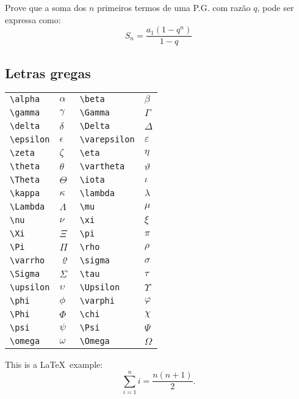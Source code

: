 \documentclass{gjvnq-livreto}
\begin{document}
\begin{latexExample}
Prove que a soma dos $n$ primeiros termos de uma P.G. com razão $q$, pode ser expressa como:
\begin{equation}
S_n = \frac{a_1(1-q^n)}{1-q}
\end{equation}
\end{latexExample}

\subsection{Letras gregas}

\begin{latexExample}
\end{latexExample}

\begin{codeBox}
\begin{longtable}{ll|ll}
\verb|\alpha| & $\alpha$ & \verb|\beta| & $\beta$ \\
\verb|\gamma| & $\gamma$ & \verb|\Gamma| & $\Gamma$ \\
\verb|\delta| & $\delta$ & \verb|\Delta| & $\Delta$ \\
\verb|\epsilon| & $\epsilon$ & \verb|\varepsilon| & $\varepsilon$ \\
\verb|\zeta| & $\zeta$ & \verb|\eta| & $\eta$ \\
\verb|\theta| & $\theta$ & \verb|\vartheta| & $\vartheta$\\
\verb|\Theta| & $\Theta$ & \verb|\iota| & $\iota$ \\
\verb|\kappa| & $\kappa$ & \verb|\lambda| & $\lambda$ \\
\verb|\Lambda| & $\Lambda$ & \verb|\mu| & $\mu$ \\
\verb|\nu| & $\nu$ & \verb|\xi| & $\xi$ \\
\verb|\Xi| & $\Xi$ & \verb|\pi| & $\pi$ \\
\verb|\Pi| & $\Pi$ & \verb|\rho| & $\rho$ \\
\verb|\varrho| & $\varrho$ & \verb|\sigma| & $\sigma$ \\
\verb|\Sigma| & $\Sigma$ & \verb|\tau| & $\tau$ \\
\verb|\upsilon| & $\upsilon$ & \verb|\Upsilon| & $\Upsilon$ \\
\verb|\phi| & $\phi$ & \verb|\varphi| & $\varphi$ \\
\verb|\Phi| & $\Phi$ & \verb|\chi| & $\chi$ \\
\verb|\psi| & $\psi$ & \verb|\Psi| & $\Psi$ \\
\verb|\omega| & $\omega$ & \verb|\Omega| & $\Omega$ \\
\end{longtable}
\end{codeBox}




\begin{latexExample}
This is a \LaTeX\ example:
\begin{equation}
\sum\limits_{i=1}^n i = \frac{n(n+1)}{2}.
\end{equation}
\end{latexExample}
\end{document}
